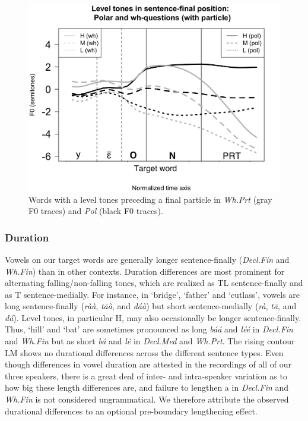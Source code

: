 \documentclass[output=paper,newtxmath,modfonts,nonflat,hidelinks]{langsci/langscibook}
\begin{document}
\vspace{-1em}
\begin{figure}
\begin{center}
\caption{Words with a level tones preceding a final particle in \textit{Wh.Prt} (gray F0 traces) and \textit{Pol} (black F0 traces).}
\label{fig:level-pol-whp}
\includegraphics[width=0.60\linewidth]{figures/Level-wh1-pol-AllSpeak_p}
\end{center}
\end{figure}




\subsubsection{Duration}\label{sec:gjersoe:duration}

Vowels on our target words are generally longer sentence-finally (\textit{Decl.Fin} and \textit{Wh.Fin}) than in other contexts.
Duration differences are most prominent for alternating falling/non-falling tones, which are realized as TL sentence-finally and as T sentence-medially.
For instance, in `bridge', `father' and `cutlass', vowels are long sentence-finally (\textit{ràà}, \textit{t\=aà}, and \textit{dáà}) but short sentence-medially (\textit{rà}, \textit{t\=a}, and \textit{dá}). Level tones, in particular H, may also occasionally be longer sentence-finally. Thus, `hill' and `bat' are sometimes pronounced as long \textit{báá} and \textit{léé} in \textit{Decl.Fin} and \textit{Wh.Fin} but as short \textit{bá} and \textit{lé} in \textit{Decl.Med} and \textit{Wh.Prt}. 
The rising contour  LM shows no durational differences across the different sentence types.
Even though differences in vowel duration are attested in the recordings of all of our three speakers, there is a great deal of inter- and intra-speaker variation as to how big these length differences are, and failure to lengthen a  in \textit{Decl.Fin} and \textit{Wh.Fin} is not considered ungrammatical.
We therefore attribute the observed durational differences to an optional pre-boundary lengthening effect.
\end{document}
